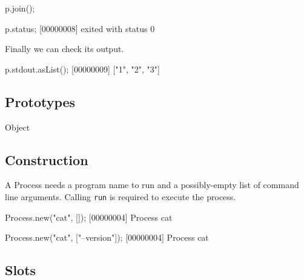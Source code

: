 \begin{urbiscript}
p.join();

p.status;
[00000008] exited with status 0
\end{urbiscript}

\noindent
Finally we can check its output.

\begin{urbiscript}
p.stdout.asList();
[00000009] ["1", "2", "3"]
\end{urbiscript}

\subsection{Prototypes}
\begin{refObjects}
\item[Object]
\end{refObjects}

\subsection{Construction}

A Process needs a program name to run and a possibly-empty list of
command line arguments.  Calling \lstinline|run| is required to
execute the process.

\begin{urbiscript}
Process.new("cat", []);
[00000004] Process cat

Process.new("cat", ["--version"]);
[00000004] Process cat
\end{urbiscript}

\subsection{Slots}

